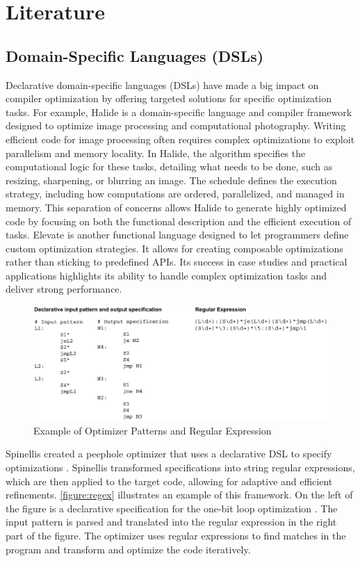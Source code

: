 \chapter[Literature Review]{Literature}

\section{Domain-Specific Languages (DSLs)}
Declarative domain-specific languages (DSLs) have made a big impact on compiler optimization by offering targeted solutions for specific optimization tasks. For example, Halide \cite{Jonathan2018} is a domain-specific language and compiler framework designed to optimize image processing and computational photography. Writing efficient code for image processing often requires complex optimizations to exploit parallelism and memory locality. In Halide, the algorithm specifies the computational logic for these tasks, detailing what needs to be done, such as resizing, sharpening, or blurring an image. The schedule defines the execution strategy, including how computations are ordered, parallelized, and managed in memory. This separation of concerns allows Halide to generate highly optimized code by focusing on both the functional description and the efficient execution of tasks. Elevate \cite{Hagedorn2020} is another functional language designed to let programmers define custom optimization strategies. It allows for creating composable optimizations rather than sticking to predefined APIs. Its success in case studies and practical applications highlights its ability to handle complex optimization tasks and deliver strong performance.

\begin{figure}[h]
    \centering
    \includegraphics[width=1\textwidth]{Packages/regex.png}
    \caption{Example of Optimizer Patterns and Regular Expression \cite{Spinellis1999}}
    \label{figure:regex}
\end{figure}

Spinellis created a peephole optimizer that uses a declarative DSL to specify optimizations \cite{Spinellis1999}. Spinellis transformed specifications into string regular expressions, which are then applied to the target code, allowing for adaptive and efficient refinements. \autoref{figure:regex} illustrates an example of this framework. On the left of the figure is a declarative specification for the one-bit loop optimization \cite{Spinellis1999}. The input pattern is parsed and translated into the regular expression in the right part of the figure. The optimizer uses regular expressions to find matches in the program and transform and optimize the code iteratively.

